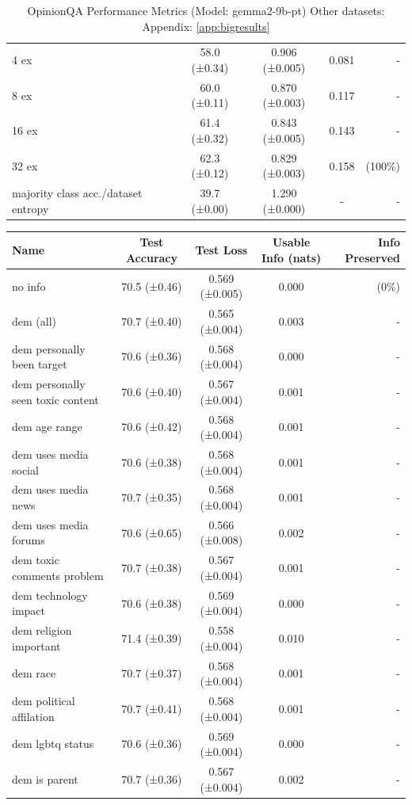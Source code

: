 \documentclass[11pt]{article}
\begin{document}
\begin{table}[h]
\begin{tabular}{|l|c|c|c|r|}
4 ex & 58.0 (±0.34) & 0.906 (±0.005) & 0.081 & - \\
8 ex & 60.0 (±0.11) & 0.870 (±0.003) & 0.117 & - \\
16 ex & 61.4 (±0.32) & 0.843 (±0.005) & 0.143 & - \\
32 ex & 62.3 (±0.12) & 0.829 (±0.003) & 0.158 & (100\%) \\
majority class acc./dataset entropy & 39.7 (±0.00) & 1.290 (±0.000) & - & - \\
\hline
\end{tabular}
\caption{OpinionQA Performance Metrics (Model: gemma2-9b-pt) Other datasets: Appendix: \ref{app:bigresults}}
\label{tab:performance_opinionqa}
\end{table}

\begin{table}[h]
\centering
\small
\begin{tabular}{|l|c|c|c|r|}
\hline
Name & Test Accuracy & Test Loss & Usable Info (nats) & Info Preserved \\
\hline
no info & 70.5 (±0.46) & 0.569 (±0.005) & 0.000 & (0\%) \\
dem (all) & 70.7 (±0.40) & 0.565 (±0.004) & 0.003 & - \\
dem personally been target & 70.6 (±0.36) & 0.568 (±0.004) & 0.000 & - \\
dem personally seen toxic content & 70.6 (±0.40) & 0.567 (±0.004) & 0.001 & - \\
dem age range & 70.6 (±0.42) & 0.568 (±0.004) & 0.001 & - \\
dem uses media social & 70.6 (±0.38) & 0.568 (±0.004) & 0.001 & - \\
dem uses media news & 70.7 (±0.35) & 0.568 (±0.004) & 0.001 & - \\
dem uses media forums & 70.6 (±0.65) & 0.566 (±0.008) & 0.002 & - \\
dem toxic comments problem & 70.7 (±0.38) & 0.567 (±0.004) & 0.001 & - \\
dem technology impact & 70.6 (±0.38) & 0.569 (±0.004) & 0.000 & - \\
dem religion important & 71.4 (±0.39) & 0.558 (±0.004) & 0.010 & - \\
dem race & 70.7 (±0.37) & 0.568 (±0.004) & 0.001 & - \\
dem political affilation & 70.7 (±0.41) & 0.568 (±0.004) & 0.001 & - \\
dem lgbtq status & 70.6 (±0.36) & 0.569 (±0.004) & 0.000 & - \\
dem is parent & 70.7 (±0.36) & 0.567 (±0.004) & 0.002 & - \\

\end{tabular}
\end{table}
\end{document}
